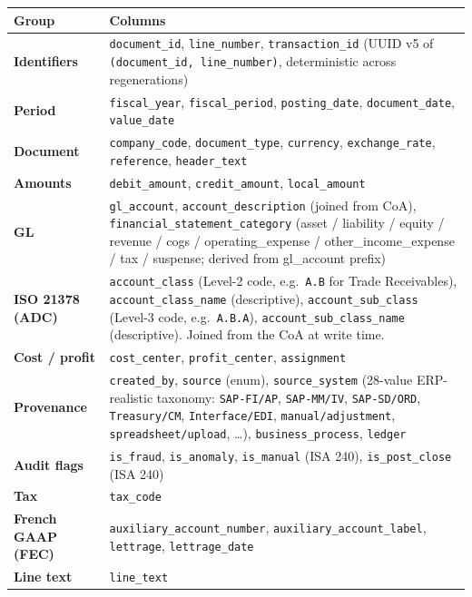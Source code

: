 \documentclass[11pt,a4paper]{article}
\begin{document}
\renewcommand{\arraystretch}{1.2}
\begin{tabularx}{\textwidth}{@{}>{\bfseries\color{brand}}l X@{}}
\toprule
\textbf{Group} & \textbf{Columns} \\
\midrule
Identifiers       & \texttt{document\_id}, \texttt{line\_number},
                    \texttt{transaction\_id} (UUID v5 of \texttt{(document\_id,
                    line\_number)}, deterministic across regenerations) \\
Period            & \texttt{fiscal\_year}, \texttt{fiscal\_period},
                    \texttt{posting\_date}, \texttt{document\_date},
                    \texttt{value\_date} \\
Document          & \texttt{company\_code}, \texttt{document\_type},
                    \texttt{currency}, \texttt{exchange\_rate},
                    \texttt{reference}, \texttt{header\_text} \\
Amounts           & \texttt{debit\_amount}, \texttt{credit\_amount},
                    \texttt{local\_amount} \\
GL                & \texttt{gl\_account}, \texttt{account\_description}
                    (joined from CoA), \texttt{financial\_statement\_category}
                    (asset / liability / equity / revenue / cogs /
                    operating\_expense / other\_income\_expense / tax /
                    suspense; derived from gl\_account prefix) \\
ISO 21378 (ADC)   & \texttt{account\_class} (Level-2 code, e.g.\ \texttt{A.B}
                    for Trade Receivables), \texttt{account\_class\_name}
                    (descriptive), \texttt{account\_sub\_class} (Level-3
                    code, e.g.\ \texttt{A.B.A}), \texttt{account\_sub\_class\_name}
                    (descriptive). Joined from the CoA at write time. \\
Cost / profit     & \texttt{cost\_center}, \texttt{profit\_center},
                    \texttt{assignment} \\
Provenance        & \texttt{created\_by}, \texttt{source} (enum),
                    \texttt{source\_system} (28-value ERP-realistic
                    taxonomy: \texttt{SAP-FI/AP}, \texttt{SAP-MM/IV},
                    \texttt{SAP-SD/ORD}, \texttt{Treasury/CM},
                    \texttt{Interface/EDI}, \texttt{manual/adjustment},
                    \texttt{spreadsheet/upload}, \ldots),
                    \texttt{business\_process}, \texttt{ledger} \\
Audit flags       & \texttt{is\_fraud}, \texttt{is\_anomaly},
                    \texttt{is\_manual} (ISA 240),
                    \texttt{is\_post\_close} (ISA 240) \\
Tax               & \texttt{tax\_code} \\
French GAAP (FEC) & \texttt{auxiliary\_account\_number},
                    \texttt{auxiliary\_account\_label}, \texttt{lettrage},
                    \texttt{lettrage\_date} \\
Line text         & \texttt{line\_text} \\
\bottomrule
\end{tabularx}
\end{document}
